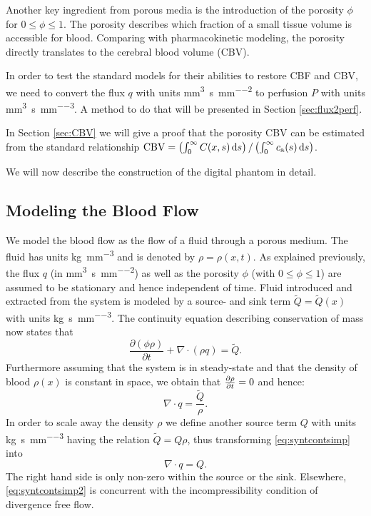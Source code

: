 \documentclass[paper=a4, fontsize=12pt,parskip=half,headings=small]{scrartcl}
\newcommand{\ca}{c_\mathrm{a}}
\newcommand{\CBV}{\mathrm{CBV}}
\newcommand{\siq}{\cubic\milli\meter\per\second\per\square\milli\meter}
\newcommand{\siP}{\cubic\milli\meter\per\second\per\cubic\milli\meter}
\newcommand{\siQ}{\kilo\gram\per\second\per\cubic\milli\meter}
\newcommand{\sirho}{\kilo\gram\per\cubic\milli\meter}
\begin{document}
	Another key ingredient from porous media is the introduction of the porosity $\phi$ for $0 \le \phi \le 1$.
	The porosity describes which fraction of a small tissue volume is accessible for blood.
	Comparing with pharmacokinetic modeling, the porosity directly translates to the cerebral blood volume (CBV).
	
	In order to test the standard models for their abilities to restore CBF and CBV, we need to convert the flux $q$ with units \si{\siq} to perfusion $P$ with units \si{\siP}. 
	A method to do that will be presented in Section \ref{sec:flux2perf}.

	In Section \ref{sec:CBV} we will give a proof that the porosity CBV can be estimated from the standard relationship $\CBV = \left(\int_0^\infty C(x,s) \diffint s\right)/\left(\int_0^\infty \ca(s) \diffint s\right)$.

	We will now describe the construction of the digital phantom in detail.
	
	
	\subsection{Modeling the Blood Flow}\label{sec:flow}
	
	We model the blood flow as the flow of a fluid through a porous medium. 
	The fluid has units \si{\sirho} and is denoted by $\rho = \rho(x,t)$.
	As explained previously, the flux $q$ (in \si{\siq}) as well as the porosity $\phi$ (with $0 \le \phi \le 1$) are assumed to be stationary and hence independent of time.
	Fluid introduced and extracted from the system is modeled by a source- and sink term $\tilde{Q} = \tilde{Q}(x)$ with units \si{\siQ}. 
	The continuity equation describing conservation of mass now states that
	\begin{equation}
		\frac{\partial (\phi \rho)}{\partial t} + \nabla \cdot (\rho q) = \tilde{Q}.
		\label{eq:syntcont}
	\end{equation} 
	Furthermore assuming that the system is in steady-state and that the density of blood $\rho(x)$ is constant in space, we obtain that $\frac{\partial \rho}{\partial t} = 0$ and hence:
	\begin{equation}
		\nabla \cdot q = \frac{\tilde{Q}}{\rho}.
		\label{eq:syntcontsimp}
	\end{equation}
	In order to scale away the density $\rho$ we define another source term $Q$ with units \si{\siQ} having the relation $\tilde{Q} = Q\rho$, thus transforming \eqref{eq:syntcontsimp} into
	\begin{equation}
		\nabla \cdot q = Q.
		\label{eq:syntcontsimp2}
	\end{equation}
	The right hand side is only non-zero within the source or the sink. 
	Elsewhere, \eqref{eq:syntcontsimp2} is concurrent with the incompressibility condition of divergence free flow.
	
\end{document}

